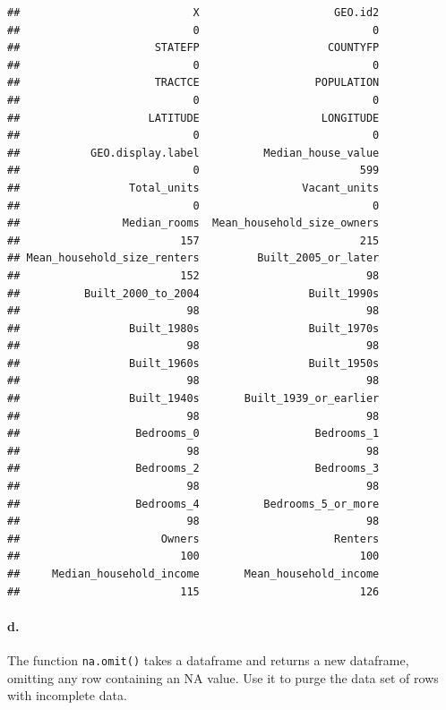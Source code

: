 \documentclass[
]{article}
\begin{document}
\begin{verbatim}
##                           X                     GEO.id2 
##                           0                           0 
##                     STATEFP                    COUNTYFP 
##                           0                           0 
##                     TRACTCE                  POPULATION 
##                           0                           0 
##                    LATITUDE                   LONGITUDE 
##                           0                           0 
##           GEO.display.label          Median_house_value 
##                           0                         599 
##                 Total_units                Vacant_units 
##                           0                           0 
##                Median_rooms  Mean_household_size_owners 
##                         157                         215 
## Mean_household_size_renters         Built_2005_or_later 
##                         152                          98 
##          Built_2000_to_2004                 Built_1990s 
##                          98                          98 
##                 Built_1980s                 Built_1970s 
##                          98                          98 
##                 Built_1960s                 Built_1950s 
##                          98                          98 
##                 Built_1940s       Built_1939_or_earlier 
##                          98                          98 
##                  Bedrooms_0                  Bedrooms_1 
##                          98                          98 
##                  Bedrooms_2                  Bedrooms_3 
##                          98                          98 
##                  Bedrooms_4          Bedrooms_5_or_more 
##                          98                          98 
##                      Owners                     Renters 
##                         100                         100 
##     Median_household_income       Mean_household_income 
##                         115                         126
\end{verbatim}

\paragraph{d.}\label{d.}

The function \texttt{na.omit()} takes a dataframe and returns a new
dataframe, omitting any row containing an NA value. Use it to purge the
data set of rows with incomplete data.
\end{document}
